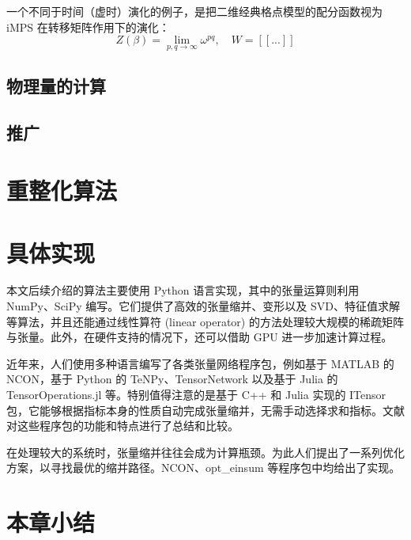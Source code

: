 一个不同于时间（虚时）演化的例子，是把二维经典格点模型的配分函数视为 iMPS 在转移矩阵作用下的演化：
\begin{equation}
  Z(\beta) = \lim_{p,q\to\infty} \omega^{pq}, \quad W = [[...]]
\end{equation}

\subsection{物理量的计算}

\subsection{推广}

\section{重整化算法}

\section{具体实现}

本文后续介绍的算法主要使用 Python 语言实现，其中的张量运算则利用 NumPy\cite{harris2020array}、SciPy\cite{virtanen2020scipy} 编写。它们提供了高效的张量缩并、变形以及 SVD、特征值求解等算法，并且还能通过线性算符 (linear operator) 的方法处理较大规模的稀疏矩阵与张量。此外，在硬件支持的情况下，还可以借助 GPU 进一步加速计算过程。

近年来，人们使用多种语言编写了各类张量网络程序包，例如基于 MATLAB 的 NCON\cite{pfeifer2014ncon}，基于 Python 的 TeNPy\cite{hauschild2018efficient}、TensorNetwork\cite{roberts2019tensornetwork} 以及基于 Julia 的 TensorOperations.jl\cite{jutho2023tensoroperations} 等。特别值得注意的是基于 C++ 和 Julia 实现的 ITensor\cite{fishman2022itensor} 包，它能够根据指标本身的性质自动完成张量缩并，无需手动选择求和指标。文献 \parencite{psarras2021landscape} 对这些程序包的功能和特点进行了总结和比较。

在处理较大的系统时，张量缩并往往会成为计算瓶颈。为此人们提出了一系列优化方案\cite{pfeifer2014faster,evenbly2014improving}，以寻找最优的缩并路径。NCON、opt\_einsum\cite{daniel2018opteinsum} 等程序包中均给出了实现。

\section{本章小结}
